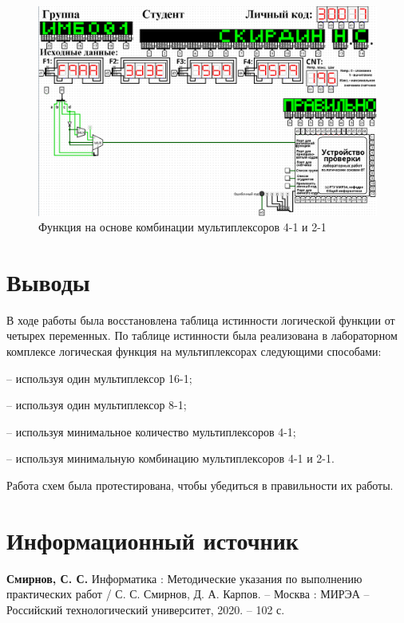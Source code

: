 \documentclass[14pt, a4paper]{extreport}
\begin{document}
\begin{figure}[H]
	\caption{Функция на основе комбинации мультиплексоров 4-1 и 2-1}
	\label{fig:multiplexer-2-1}
	\includegraphics[width=\textwidth]{multiplexer-2-1}
\end{figure}

\chapter{Выводы}
В ходе работы была восстановлена таблица истинности логической функции от четырех переменных. По таблице истинности была реализована в лабораторном комплексе логическая функция на мультиплексорах следующими способами:

– используя один мультиплексор 16-1;

– используя один мультиплексор 8-1;

– используя минимальное количество мультиплексоров 4-1;

– используя минимальную комбинацию мультиплексоров 4-1 и 2-1.

Работа схем была протестирована, чтобы убедиться в правильности их работы.

\chapter{Информационный источник}
\textbf{Смирнов, С. С.} Информатика : Методические указания по выполнению практических работ / С. С. Смирнов, Д. А. Карпов. -- Москва : МИРЭА -- Российский технологический университет, 2020. -- 102 с.
\end{document}
